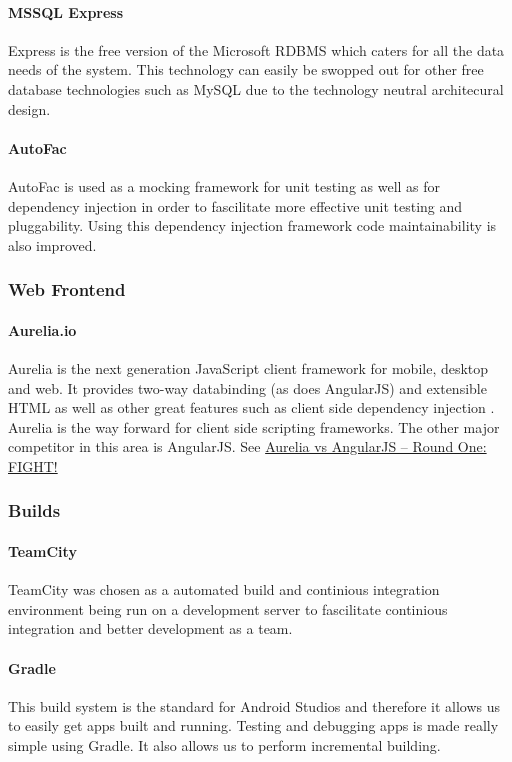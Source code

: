\documentclass[11pt,a4paper,titlepage]{article}
\begin{document}
			\paragraph{MSSQL Express}
					Express is the free version of the Microsoft RDBMS which caters for all the data needs of the system. This technology can easily be swopped out for other free database technologies such as MySQL
					due to the technology neutral architecural design.
			\paragraph{AutoFac}
					AutoFac is used as a mocking framework for unit testing as well as for dependency injection in order to fascilitate more effective unit testing and pluggability. Using this dependency injection framework code maintainability is also improved.
		\subsubsection{Web Frontend}
			\paragraph{Aurelia.io}
				Aurelia is the next generation JavaScript client framework for mobile, desktop and web. It provides two-way databinding (as does AngularJS) and extensible HTML as well as other great features such as client side dependency injection
				. Aurelia is the way forward for client side scripting frameworks. The other major competitor in this area is AngularJS. See \href{http://ilikekillnerds.com/2015/01/aurelia-vs-angularjs-round-one-fight/}{Aurelia vs AngularJS – Round One: FIGHT!}
		\subsubsection{Builds}		
			\paragraph{TeamCity}
				TeamCity was chosen as a automated build and continious integration environment being run on a development server to fascilitate continious integration and better development as a team.
			\paragraph{Gradle}
				This build system is the standard for Android Studios and therefore it allows us to easily get apps built and running. Testing and debugging apps is made really simple using Gradle. It also allows us to perform incremental building. 
\end{document}
